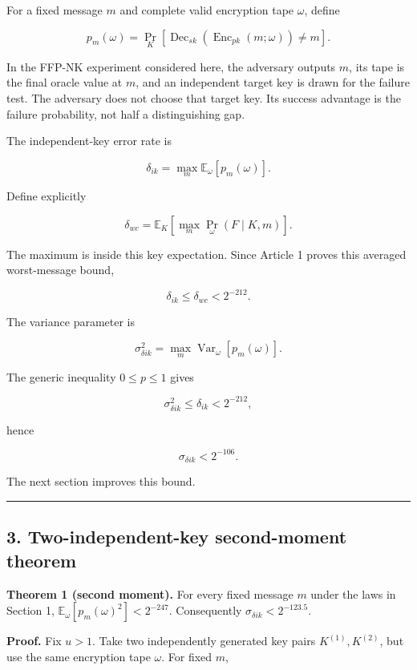\documentclass[11pt,a4paper]{article}
\begin{document}
For a fixed message \(m\) and complete valid encryption tape \(\omega\), define

\[
p_m(\omega)
=
\Pr_K[
\operatorname{Dec}_{sk}(\operatorname{Enc}_{pk}(m;\omega))\ne m
].
\]

In the FFP-NK experiment considered here, the adversary outputs \(m\), its tape is the final oracle value at \(m\), and an independent target key is drawn for the failure test. The adversary does not choose that target key. Its success advantage is the failure probability, not half a distinguishing gap.

The independent-key error rate is

\[
\delta_{ik}
=
\max_m\mathbb E_\omega[p_m(\omega)].
\]

Define explicitly

\[
\delta_{wc}=\mathbb E_K\!\left[\max_m\Pr_\omega(F\mid K,m)\right].
\]

The maximum is inside this key expectation. Since Article 1 proves this averaged worst-message bound,

\[
\delta_{ik}\le\delta_{wc}<2^{-212}.
\]

The variance parameter is

\[
\sigma_{\delta ik}^2
=
\max_m
\operatorname{Var}_{\omega}[p_m(\omega)].
\]

The generic inequality \(0\le p\le1\) gives

\[
\sigma_{\delta ik}^2\le\delta_{ik}<2^{-212},
\]

hence

\[
\sigma_{\delta ik}<2^{-106}.
\]

The next section improves this bound.

\begin{center}\rule{0.5\linewidth}{0.5pt}\end{center}

\subsection{3. Two-independent-key second-moment theorem}\label{two-independent-key-second-moment-theorem}

\textbf{Theorem 1 (second moment).} For every fixed message \(m\) under the laws in Section 1, \(\mathbb E_\omega[p_m(\omega)^2]<2^{-247}\). Consequently \(\sigma_{\delta ik}<2^{-123.5}\).

\textbf{Proof.} Fix \(u>1\). Take two independently generated key pairs \(K^{(1)},K^{(2)}\), but use the same encryption tape \(\omega\). For fixed \(m\),
\end{document}
